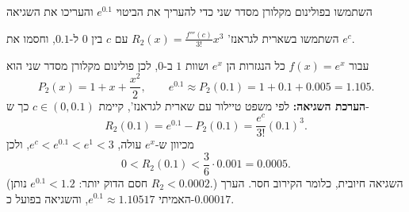 
\begin{question}
השתמשו בפולינום מקלורן מסדר שני כדי להעריך את הביטוי $e^{0.1}$ והעריכו את השגיאה
\end{question}

\begin{hint}
השתמשו בשארית לגראנז' $R_2(x)=\frac{f'''(c)}{3!}x^3$ עם $c$ בין $0$ ל-$0.1$, וחסמו את $e^c$.
\end{hint}

\begin{solution}
עבור $f(x)=e^x$ כל הנגזרות הן $e^x$ ושוות $1$ ב-$0$, לכן פולינום מקלורן מסדר שני הוא
\[ P_2(x)=1+x+\frac{x^2}{2}, \qquad e^{0.1}\approx P_2(0.1)=1+0.1+0.005=\boxed{1.105}. \]
\textbf{הערכת השגיאה:} לפי משפט טיילור עם שארית לגראנז', קיימת $c\in(0,0.1)$ כך ש-
\[ R_2(0.1)=e^{0.1}-P_2(0.1)=\frac{e^{c}}{3!}(0.1)^3. \]
מכיוון ש-$e^x$ עולה, $e^c<e^{0.1}<e^1<3$, ולכן
\[ 0<R_2(0.1)<\frac{3}{6}\cdot 0.001=0.0005. \]
(חסם הדוק יותר: $e^{0.1}<1.2$ נותן $R_2<0.0002$.) השגיאה חיובית, כלומר הקירוב חסר. הערך האמיתי $e^{0.1}\approx 1.10517$, והשגיאה בפועל כ-$0.00017$.
\end{solution}
